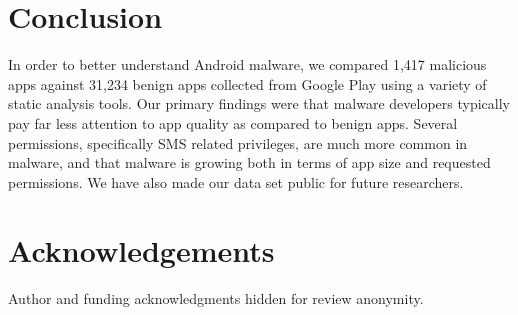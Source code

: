 \documentclass{sig-alternate}
\newcommand{\todo}[1]{\textcolor{cyan}{\textbf{[#1]}}}
\newif\ifisnopii
\begin{document}







\section{Conclusion}
\label{sec: conclusion}
In order to better understand Android malware, we compared 1,417 malicious apps against 31,234 benign apps collected from Google Play using a variety of static analysis tools. Our primary findings were that malware developers typically pay far less attention to app quality as compared to benign apps. Several permissions, specifically SMS related privileges, are much more common in malware, and that malware is growing both in terms of app size and requested permissions. We have also made our data set public for future researchers.




%



\section*{Acknowledgements}

\ifisnopii %
\todo{put information in here}
\else %
Author and funding acknowledgments hidden for review anonymity.
\fi %


\balance





\end{document}
